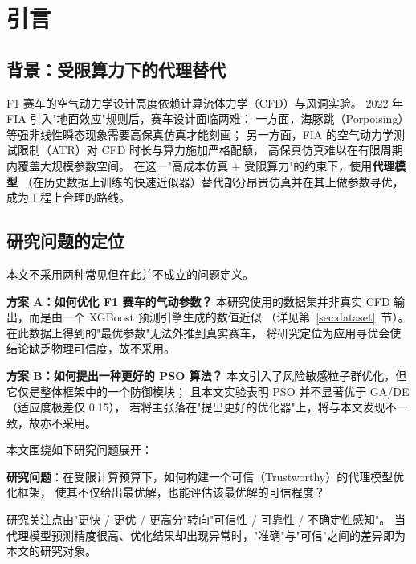 \section{引言}\label{sec:intro}

\subsection{背景：受限算力下的代理替代}

F1 赛车的空气动力学设计高度依赖计算流体力学（CFD）与风洞实验。
2022 年 FIA 引入"地面效应"规则后，赛车设计面临两难：
一方面，海豚跳（Porpoising）等强非线性瞬态现象需要高保真仿真才能刻画；
另一方面，FIA 的空气动力学测试限制（ATR）对 CFD 时长与算力施加严格配额，
高保真仿真难以在有限周期内覆盖大规模参数空间。
在这一"高成本仿真 $+$ 受限算力"的约束下，使用\textbf{代理模型}
（在历史数据上训练的快速近似器）替代部分昂贵仿真并在其上做参数寻优，
成为工程上合理的路线。

\subsection{研究问题的定位}

本文不采用两种常见但在此并不成立的问题定义。

\vspace{0.2cm}
\noindent\textbf{方案 A：如何优化 F1 赛车的气动参数？}\quad
本研究使用的数据集并非真实 CFD 输出，而是由一个 XGBoost 预测引擎生成的数值近似
（详见第~\ref{sec:dataset}~节）。在此数据上得到的"最优参数"无法外推到真实赛车，
将研究定位为应用寻优会使结论缺乏物理可信度，故不采用。

\vspace{0.2cm}
\noindent\textbf{方案 B：如何提出一种更好的 PSO 算法？}\quad
本文引入了风险敏感粒子群优化，但它仅是整体框架中的一个防御模块；
且本文实验表明 PSO 并不显著优于 GA/DE（适应度极差仅 0.15），
若将主张落在"提出更好的优化器"上，将与本文发现不一致，故亦不采用。

\vspace{0.2cm}
\noindent
本文围绕如下研究问题展开：

\begin{chapterquestion}
\textbf{研究问题}：在受限计算预算下，如何构建一个可信（Trustworthy）的代理模型优化框架，
使其不仅给出最优解，也能评估该最优解的可信程度？
\end{chapterquestion}

研究关注点由"更快 / 更优 / 更高分"转向"可信性 / 可靠性 / 不确定性感知"。
当代理模型预测精度很高、优化结果却出现异常时，"准确"与"可信"之间的差异即为本文的研究对象。

